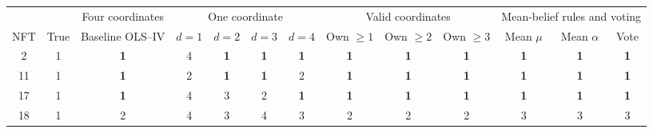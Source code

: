 \documentclass[12pt,reqno]{amsart}
\begin{document}
\begin{landscape}
\thispagestyle{plain}
\noindent
\begin{adjustbox}{max totalsize={\linewidth}{0.95\vsize},center}
\begin{minipage}{\linewidth}
\centering

\label{alternative-matching}

\begingroup
\tiny
\renewcommand{\baselinestretch}{1}\selectfont
\setlength{\tabcolsep}{3pt}
\renewcommand{\arraystretch}{1.04}

\begin{tabular}{@{}cc*{11}{c}@{}}
\toprule
& &
\multicolumn{1}{c}{Four coordinates} &
\multicolumn{4}{c}{One coordinate} &
\multicolumn{3}{c}{Valid coordinates} &
\multicolumn{3}{c}{ Mean-belief rules and voting} \\
\cmidrule(lr){3-3}
\cmidrule(lr){4-7}
\cmidrule(lr){8-10}
\cmidrule(l){11-13}
NFT & True & Baseline OLS--IV
& $d=1$ & $d=2$ & $d=3$ & $d=4$
& Own $\geq1$ & Own $\geq2$ & Own $\geq3$
& Mean $\mu$ & Mean $\alpha$ & Vote \\
\midrule

2 & 1
& \textcolor{goodblue}{\bfseries 1}
& 4
& \textcolor{goodblue}{\bfseries 1}
& \textcolor{goodblue}{\bfseries 1}
& \textcolor{goodblue}{\bfseries 1}
& \textcolor{goodblue}{\bfseries 1}
& \textcolor{goodblue}{\bfseries 1}
& \textcolor{goodblue}{\bfseries 1}
& \textcolor{goodblue}{\bfseries 1}
& \textcolor{goodblue}{\bfseries 1}
& \textcolor{goodblue}{\bfseries 1} \\

11 & 1
& \textcolor{goodblue}{\bfseries 1}
& 2
& \textcolor{goodblue}{\bfseries 1}
& \textcolor{goodblue}{\bfseries 1}
& 2
& \textcolor{goodblue}{\bfseries 1}
& \textcolor{goodblue}{\bfseries 1}
& \textcolor{goodblue}{\bfseries 1}
& \textcolor{goodblue}{\bfseries 1}
& \textcolor{goodblue}{\bfseries 1}
& \textcolor{goodblue}{\bfseries 1} \\

17 & 1
& \textcolor{goodblue}{\bfseries 1}
& 4 & 3 & 2
& \textcolor{goodblue}{\bfseries 1}
& \textcolor{goodblue}{\bfseries 1}
& \textcolor{goodblue}{\bfseries 1}
& \textcolor{goodblue}{\bfseries 1}
& \textcolor{goodblue}{\bfseries 1}
& \textcolor{goodblue}{\bfseries 1}
& \textcolor{goodblue}{\bfseries 1} \\

18 & 1
& 2 & 4 & 3 & 4 & 3 & 2 & 2 & 2 & 3 & 3 & 3 \\


\end{tabular}
\end{minipage}
\end{adjustbox}
\end{landscape}
\end{document}
